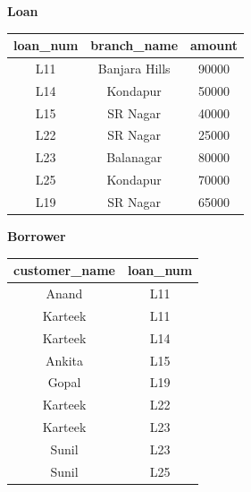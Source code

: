 \begin{minipage}[t]{0.52\textwidth}
	\centering
	\textbf{Loan} \\[1ex]
	\begin{tabular}{|c|c|c|}
		\hline
		\textbf{loan\_num} & \textbf{branch\_name} & \textbf{amount} \\ \hline
		L11 & Banjara Hills & 90000 \\ \hline
		L14 & Kondapur      & 50000 \\ \hline
		L15 & SR Nagar      & 40000 \\ \hline
		L22 & SR Nagar      & 25000 \\ \hline
		L23 & Balanagar     & 80000 \\ \hline
		L25 & Kondapur      & 70000 \\ \hline
		L19 & SR Nagar      & 65000 \\ \hline
	\end{tabular}
\end{minipage}%
\begin{minipage}[t]{0.45\textwidth}
	\centering
	\textbf{Borrower} \\[1ex]
	\begin{tabular}{|c|c|}
		\hline
		\textbf{customer\_name} & \textbf{loan\_num} \\ \hline
		Anand   & L11 \\ \hline
		Karteek & L11 \\ \hline
		Karteek & L14 \\ \hline
		Ankita  & L15 \\ \hline
		Gopal   & L19 \\ \hline
		Karteek & L22 \\ \hline
		Karteek & L23 \\ \hline
		Sunil   & L23 \\ \hline
		Sunil   & L25 \\ \hline
	\end{tabular}
\end{minipage}